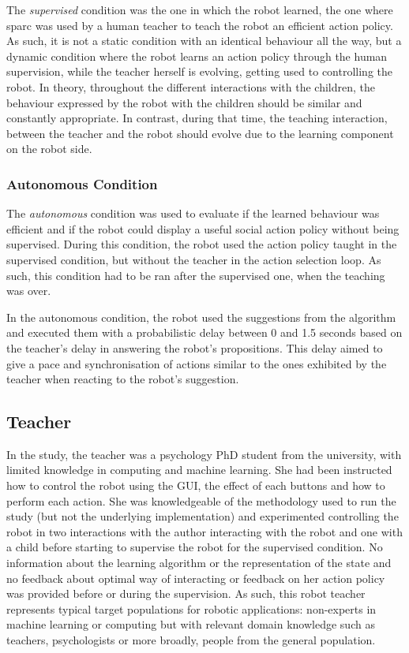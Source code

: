 The \textit{supervised} condition was the one in which the robot learned, the one where \gls{sparc} was used by a human teacher to teach the robot an efficient action policy. As such, it is not a static condition with an identical behaviour all the way, but a dynamic condition where the robot learns an action policy through the human supervision, while the teacher herself is evolving, getting used to controlling the robot. In theory, throughout the different interactions with the children, the behaviour expressed by the robot with the children should be similar and constantly appropriate. In contrast, during that time, the teaching interaction, between the teacher and the robot should evolve due to the learning component on the robot side. 

\subsubsection{Autonomous Condition}

The \textit{autonomous} condition was used to evaluate if the learned behaviour was efficient and if the robot could display a useful social action policy without being supervised. During this condition, the robot used the action policy taught in the supervised condition, but without the teacher in the action selection loop. As such, this condition had to be ran after the supervised one, when the teaching was over. %

In the autonomous condition, the robot used the suggestions from the algorithm and executed them with a probabilistic delay between 0 and 1.5 seconds based on the teacher's delay in answering the robot's propositions. This delay aimed to give a pace and synchronisation of actions similar to the ones exhibited by the teacher when reacting to the robot's suggestion.

\subsection{Teacher}
In the study, the teacher was a psychology PhD student from the university, with limited knowledge in computing and machine learning. She had been instructed how to control the robot using the GUI, the effect of each buttons and how to perform each action. She was knowledgeable of the methodology used to run the study (but not the underlying implementation) and experimented controlling the robot in two interactions with the author interacting with the robot and one with a child before starting to supervise the robot for the supervised condition. No information about the learning algorithm or the representation of the state and no feedback about optimal way of interacting or feedback on her action policy was provided before or during the supervision. As such, this robot teacher represents typical target populations for robotic applications: non-experts in machine learning or computing but with relevant domain knowledge such as teachers, psychologists or more broadly, people from the general population.

